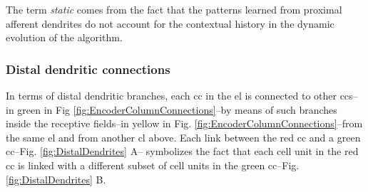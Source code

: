 \documentclass[11pt,a4paper]{article}
\begin{document}
The term \textit{static} comes from the fact that the patterns learned from proximal afferent
dendrites do not account for the contextual history in the dynamic evolution
of the algorithm.








\subsubsection*{Distal dendritic connections}

In terms of distal dendritic branches, each \gls{cc} in the \gls{el} is connected to other \glspl{cc}--in green in Fig \ref{fig:EncoderColumnConnections}--by means of such
branches inside the receptive fields--in yellow in Fig. \ref{fig:EncoderColumnConnections}--from the same \gls{el} and from another \gls{cl}
above.
Each link between the red \gls{cc} and a green \gls{cc}--Fig. \ref{fig:DistalDendrites} A--
symbolizes the fact that each cell unit in
the red \gls{cc} is linked with a different subset of cell units in the green \gls{cc}--Fig. \ref{fig:DistalDendrites} B.
\end{document}
